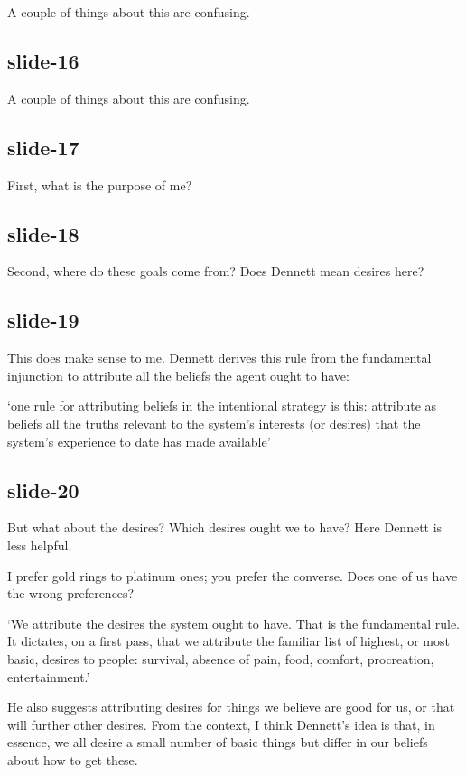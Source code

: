 \documentclass[12pt,\papersize]{extarticle}
\begin{document}
\citep[p.~17]{Dennett:1987sf}
A couple of things about this are confusing.

\subsection{slide-16}
\citep[p.~17]{Dennett:1987sf}

A couple of things about this are confusing.

\subsection{slide-17}
First, what is the purpose of me?

\subsection{slide-18}
Second, where do these goals come from?
Does Dennett mean desires here?

\subsection{slide-19}
This does make sense to me.
Dennett derives this rule from the fundamental injunction to attribute all the beliefs
the agent ought to have:

‘one rule for attributing beliefs in the intentional strategy is this: attribute as beliefs all the truths relevant to the system's interests (or desires) that the system's experience to date has made available’ \citep[p.~18]{Dennett:1987sf}

\subsection{slide-20}
But what about the desires?
Which desires ought we to have?
Here Dennett is less helpful.

I prefer gold rings to platinum ones; you prefer the converse.
Does one of us have the wrong preferences?

‘We attribute the desires the system ought to have. That is the fundamental rule. It dictates, on a first pass, that we attribute the familiar list of highest, or most basic, desires to people: survival, absence of pain, food, comfort, procreation, entertainment.’ \citep[p.~20]{Dennett:1987sf}

He also suggests attributing desires for things we believe are good for us,
or that will further other desires.
From the context, I think Dennett’s idea is that, in essence, we all desire
a small number of basic things but differ in our beliefs about how to get these.
\end{document}
